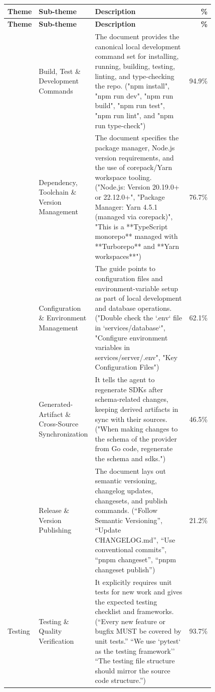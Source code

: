 {\footnotesize
\begin{longtable}{|p{0.14\linewidth}|p{0.18\linewidth}|p{0.5\linewidth}|r|}
\hline
\textbf{Theme} & \textbf{Sub-theme} & \textbf{Description} & \textbf{\%} \\
\hline
\endfirsthead

\hline
\textbf{Theme} & \textbf{Sub-theme} & \textbf{Description} & \textbf{\%} \\
\hline
\endhead

\hline
\endfoot

\hline
\endlastfoot

\multirow{5}{=}{\centering Development} & Build, Test \& Development Commands & The document provides the canonical local development command set for installing, running, building, testing, linting, and type-checking the repo. ("npm install", "npm run dev", "npm run build", "npm run test", "npm run lint", and "npm run type-check") & 94.9\% \\
\hhline{~||-|-|-|}
 & Dependency, Toolchain \& Version Management & The document specifies the package manager, Node.js version requirements, and the use of corepack/Yarn workspace tooling. ("Node.js: Version 20.19.0+ or 22.12.0+", "Package Manager: Yarn 4.5.1 (managed via corepack)", "This is a **TypeScript monorepo** managed with **Turborepo** and **Yarn workspaces**") & 76.7\% \\
\hhline{~||-|-|-|}
 & Configuration \& Environment Management & The guide points to configuration files and environment-variable setup as part of local development and database operations. ("Double check the `.env` file in `services/database`", "Configure environment variables in services/server/.env", "Key Configuration Files") & 62.1\% \\
\hhline{~||-|-|-|}
 & Generated-Artifact \& Cross-Source Synchronization & It tells the agent to regenerate SDKs after schema-related changes, keeping derived artifacts in sync with their sources. ("When making changes to the schema of the provider from Go code, regenerate the schema and sdks.") & 46.5\% \\
\hhline{~||-|-|-|}
 & Release \& Version Publishing & The document lays out semantic versioning, changelog updates, changesets, and publish commands. (``Follow Semantic Versioning'', ``Update CHANGELOG.md'', ``Use conventional commits'', ``pnpm changeset'', ``pnpm changeset publish'') & 21.2\% \\
\hline
\multirow{1}{=}{\centering Testing} & Testing \& Quality Verification & It explicitly requires unit tests for new work and gives the expected testing checklist and frameworks. (``Every new feature or bugfix MUST be covered by unit tests.'' ``We use `pytest` as the testing framework'' ``The testing file structure should mirror the source code structure.'') & 93.7\% \\

\end{longtable}}
